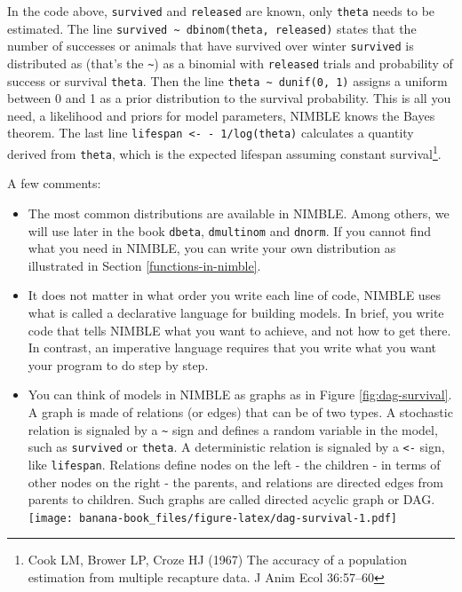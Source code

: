\documentclass[
  12pt,
]{krantz}
\begin{document}
In the code above, \texttt{survived} and \texttt{released} are known, only \texttt{theta} needs to be estimated. The line \texttt{survived\ \textasciitilde{}\ dbinom(theta,\ released)} states that the number of successes or animals that have survived over winter \texttt{survived} is distributed as (that's the \texttt{\textasciitilde{}}) as a binomial with \texttt{released} trials and probability of success or survival \texttt{theta}. Then the line \texttt{theta\ \textasciitilde{}\ dunif(0,\ 1)} assigns a uniform between 0 and 1 as a prior distribution to the survival probability. This is all you need, a likelihood and priors for model parameters, NIMBLE knows the Bayes theorem. The last line \texttt{lifespan\ \textless{}-\ -\ 1/log(theta)} calculates a quantity derived from \texttt{theta}, which is the expected lifespan assuming constant survival\footnote{Cook LM, Brower LP, Croze HJ (1967) The accuracy of a population estimation from multiple recapture data. J Anim Ecol 36:57--60}.

A few comments:

\begin{itemize}
\item
  The most common distributions are available in NIMBLE. Among others, we will use later in the book \texttt{dbeta}, \texttt{dmultinom} and \texttt{dnorm}. If you cannot find what you need in NIMBLE, you can write your own distribution as illustrated in Section \ref{functions-in-nimble}.
\item
  It does not matter in what order you write each line of code, NIMBLE uses what is called a declarative language for building models. In brief, you write code that tells NIMBLE what you want to achieve, and not how to get there. In contrast, an imperative language requires that you write what you want your program to do step by step.
\item
  You can think of models in NIMBLE as graphs as in Figure \ref{fig:dag-survival}. A graph is made of relations (or edges) that can be of two types. A stochastic relation is signaled by a \texttt{\textasciitilde{}} sign and defines a random variable in the model, such as \texttt{survived} or \texttt{theta}. A deterministic relation is signaled by a \texttt{\textless{}-} sign, like \texttt{lifespan}. Relations define nodes on the left - the children - in terms of other nodes on the right - the parents, and relations are directed edges from parents to children. Such graphs are called directed acyclic graph or DAG.
  \texttt{[image: banana-book\_files/figure-latex/dag-survival-1.pdf]}
\end{itemize}
\end{document}
